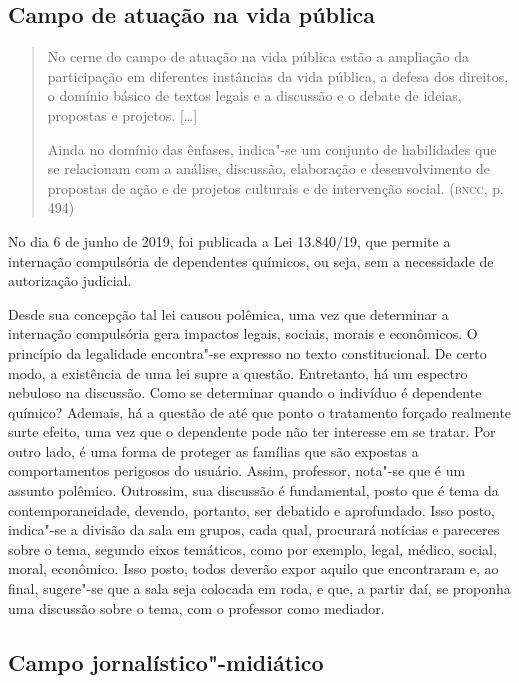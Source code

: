 \documentclass{article}
\begin{document}
\subsection{Campo de atuação na vida pública}

\begin{quote}
No cerne do campo de atuação na vida pública estão a ampliação da
participação em diferentes instâncias da vida pública, a defesa dos
direitos, o domínio básico de textos legais e a discussão e o debate de
ideias, propostas e projetos. {[}\ldots{}{]}

Ainda no domínio das ênfases, indica"-se um conjunto de habilidades que
se relacionam com a análise, discussão, elaboração e desenvolvimento de
propostas de ação e de projetos culturais e de intervenção social.
(\textsc{bncc}, p. 494)
\end{quote}

No dia 6 de junho de 2019, foi publicada a Lei 13.840/19, que permite
a internação compulsória de dependentes químicos, ou seja, sem a
necessidade de autorização judicial.

Desde sua concepção tal lei causou polêmica, uma vez que determinar a
internação compulsória gera impactos legais, sociais, morais e
econômicos. O princípio da legalidade encontra"-se expresso no texto
constitucional. De certo modo, a existência de uma lei supre a questão.
Entretanto, há um espectro nebuloso na discussão. Como se determinar
quando o indivíduo é dependente químico? Ademais, há a questão de até
que ponto o tratamento forçado realmente surte efeito, uma vez que o
dependente pode não ter interesse em se tratar. Por outro lado, é uma
forma de proteger as famílias que são expostas a comportamentos
perigosos do usuário. Assim, professor, nota"-se que é um assunto
polêmico. Outrossim, sua discussão é fundamental, posto que é tema da
contemporaneidade, devendo, portanto, ser debatido e aprofundado. Isso
posto, indica"-se a divisão da sala em grupos, cada qual, procurará
notícias e pareceres sobre o tema, segundo eixos temáticos, como por
exemplo, legal, médico, social, moral, econômico. Isso posto, todos
deverão expor aquilo que encontraram e, ao final, sugere"-se que a sala
seja colocada em roda, e que, a partir daí, se proponha uma discussão
sobre o tema, com o professor como mediador.

\subsection{Campo jornalístico"-midiático}
\end{document}
